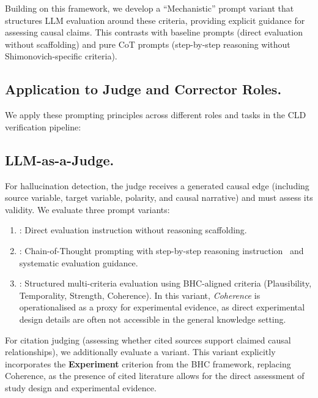 Building on this framework, we develop a ``Mechanistic'' prompt variant that structures LLM evaluation around these criteria, providing explicit guidance for assessing causal claims. This contrasts with baseline prompts (direct evaluation without scaffolding) and pure CoT prompts (step-by-step reasoning without Shimonovich-specific criteria).

\subsection{Application to Judge and Corrector Roles.}

We apply these prompting principles across different roles and tasks in the CLD verification pipeline:

\subsection{LLM-as-a-Judge.}
For hallucination detection, the judge receives a generated causal edge (including source variable, target variable, polarity, and causal narrative) and must assess its validity. We evaluate three prompt variants:
\begin{enumerate}
    \item \textbf{\PromptBaseline}: Direct evaluation instruction without reasoning scaffolding.
    \item \textbf{\PromptCoT}: Chain-of-Thought prompting with step-by-step reasoning instruction~\citep{kojima2022large} and systematic evaluation guidance.
    \item \textbf{\PromptMechanistic}: Structured multi-criteria evaluation using BHC-aligned criteria (Plausibility, Temporality, Strength, Coherence). In this variant, \textit{Coherence} is operationalised as a proxy for experimental evidence, as direct experimental design details are often not accessible in the general knowledge setting.
\end{enumerate}

For citation judging (assessing whether cited sources support claimed causal relationships), we additionally evaluate a \textbf{\PromptMechanisticLit} variant. This variant explicitly incorporates the \textbf{Experiment} criterion from the BHC framework, replacing Coherence, as the presence of cited literature allows for the direct assessment of study design and experimental evidence.


